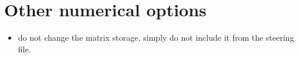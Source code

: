\section{Other numerical options}
\begin{itemize}
\item do not change the matrix storage, simply do not include it from the steering file.
\end{itemize}
